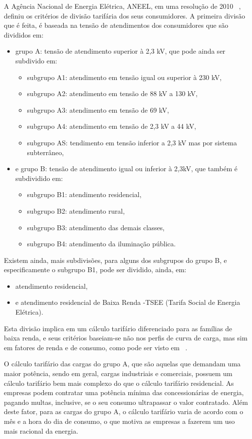 A Agência Nacional de Energia Elétrica, ANEEL, em uma resolução de 2010 ~\parencite{ANEEL}, definiu os critérios de divisão tarifária dos seus consumidores. A primeira divisão que é feita, é baseada na tensão de atendimentos dos consumidores que são divididos em:
\begin{itemize}
	\item grupo A: tensão de atendimento superior à 2,3 kV, que pode ainda ser subdivido em:
	\begin{itemize}
		\item subgrupo A1: atendimento em tensão igual ou superior à 230 kV,
		\item subgrupo A2: atendimento em tensão de 88 kV a 130 kV,
		\item subgrupo A3: atendimento em tensão de 69 kV,
		\item subgrupo A4: atendimento em tensão de 2,3 kV a 44 kV,
		\item subgrupo AS: tendimento em tensão inferior a 2,3 kV mas por sistema subterrâneo,
	\end{itemize}
	\item e grupo B: tensão de atendimento igual ou inferior à 2,3kV, que também é subdividido em:
	\begin{itemize}
		\item subgrupo B1: atendimento residencial,
		\item subgrupo B2: atendimento rural,
		\item subgrupo B3: atendimento das demais classes,
		\item subgrupo B4: atendimento da iluminação pública.
	\end{itemize}
\end{itemize}

Existem ainda, mais subdivisões, para alguns dos subgrupos do grupo B, e especificamente o subgrupo B1, pode ser dividido, ainda, em:
\begin{itemize}
	\item atendimento residencial,
	\item e atendimento residencial de Baixa Renda -TSEE (Tarifa Social de Energia Elétrica).
\end{itemize}
Esta divisão implica em um cálculo tarifário diferenciado para as famílias de baixa renda, e seus critérios baseiam-se não nos perfis de curva de carga, mas sim em fatores de renda e de consumo, como pode ser visto em ~\parencite{TSEE}.

O cálculo tarifário das cargas do grupo A, que são aquelas que demandam uma maior potência, sendo em geral, cargas industriais e comerciais, possuem um cálculo tarifário bem mais complexo do que o cálculo tarifário residencial. As empresas podem contratar uma potência mínima das concessionárias de energia, pagando multas, inclusive, se o seu consumo ultrapassar o valor contratado. Além deste fator, para as cargas do grupo A, o cálculo tarifário varia de acordo com o mês e a hora do dia de consumo, o que motiva as empresas a fazerem um uso mais racional da energia.

